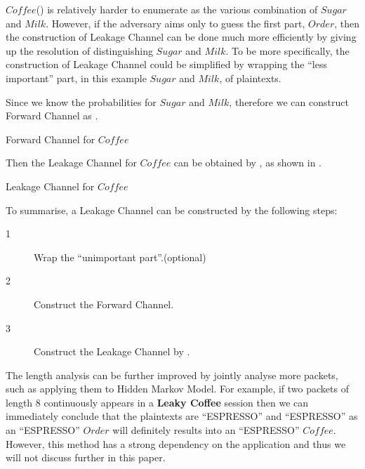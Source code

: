\begin{example} \label{Ex: Single-OrderFlavour}
$Coffee$() is relatively harder to enumerate as the various combination of $Sugar$ and $Milk$. However, if the adversary aims only to guess the first part, $Order$, then the construction of Leakage Channel can be done much more efficiently by giving up the resolution of distinguishing $Sugar$ and $Milk$. To be more specifically, the construction of Leakage Channel could be simplified by wrapping the “less important” part, in this example $Sugar$ and $Milk$, of plaintexts.

Since we know the probabilities for $Sugar$ and $Milk$, therefore we can construct Forward Channel as .

\begin{table}[H]
\centering
\resizebox{\textwidth}{!}{
{}
}
\caption{Forward Channel for $Coffee$}
\label{Tbl: Forward Channel for Coffee}
\end{table}

Then the Leakage Channel for $Coffee$ can be obtained by , as shown in .
\begin{table}[H]
\centering
{}
\caption{Leakage Channel for $Coffee$}
\label{Tbl: Leakage Channel for Coffee}
\end{table}
\end{example}

To summarise, a Leakage Channel can be constructed by the following steps:
\begin{description}
\item[1] Wrap the “unimportant part”.(optional)
\item[2] Construct the Forward Channel.
\item[3] Construct the Leakage Channel by .
\end{description}

The length analysis can be further improved by jointly analyse more packets, such as applying them to Hidden Markov Model. For example, if two packets of length $8$ continuously appears in a \textbf{Leaky Coffee} session then we can immediately conclude that the plaintexts are “ESPRESSO” and “ESPRESSO” as an “ESPRESSO” $Order$ will definitely results into an “ESPRESSO” $Coffee$. However, this method has a strong dependency on the application and thus we will not discuss further in this paper.


